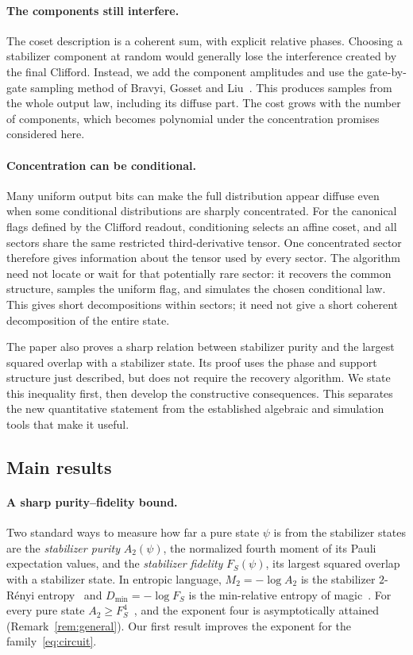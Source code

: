 \documentclass[a4paper,onecolumn,11pt,unpublished]{quantumarticle}
\theoremstyle{plain}
\theoremstyle{remark}
\begin{document}
\paragraph{The components still interfere.}
The coset description is a coherent sum, with explicit relative phases. Choosing a stabilizer component at random would generally lose the interference created by the final Clifford. Instead, we add the component amplitudes and use the gate-by-gate sampling method of Bravyi, Gosset and Liu~\cite{BGL22}. This produces samples from the whole output law, including its diffuse part. The cost grows with the number of components, which becomes polynomial under the concentration promises considered here.

\paragraph{Concentration can be conditional.}
Many uniform output bits can make the full distribution appear diffuse even when some conditional distributions are sharply concentrated. For the canonical flags defined by the Clifford readout, conditioning selects an affine coset, and all sectors share the same restricted third-derivative tensor. One concentrated sector therefore gives information about the tensor used by every sector. The algorithm need not locate or wait for that potentially rare sector: it recovers the common structure, samples the uniform flag, and simulates the chosen conditional law. This gives short decompositions within sectors; it need not give a short coherent decomposition of the entire state.

The paper also proves a sharp relation between stabilizer purity and the largest squared overlap with a stabilizer state. Its proof uses the phase and support structure just described, but does not require the recovery algorithm. We state this inequality first, then develop the constructive consequences. This separates the new quantitative statement from the established algebraic and simulation tools that make it useful.


\subsection{Main results}

\paragraph{A sharp purity--fidelity bound.}
Two standard ways to measure how far a pure state $\psi$ is from the stabilizer states are the \emph{stabilizer purity} $A_2(\psi)$, the normalized fourth moment of its Pauli expectation values, and the \emph{stabilizer fidelity} $F_S(\psi)$, its largest squared overlap with a stabilizer state. In entropic language, $M_2=-\log A_2$ is the stabilizer $2$-R\'enyi entropy~\cite{LOH22} and $D_{\min}=-\log F_S$ is the min-relative entropy of magic~\cite{LW22}. For every pure state $A_2\ge F_S^4$~\cite{HP23,HLK24}, and the exponent four is asymptotically attained (Remark~\ref{rem:general}). Our first result improves the exponent for the family~\eqref{eq:circuit}.
\end{document}
